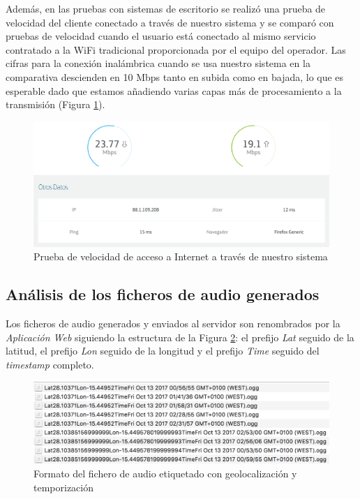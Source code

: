 Además, en las pruebas con sistemas de escritorio se realizó una prueba de velocidad del cliente conectado a través de nuestro sistema y se comparó con pruebas de velocidad cuando el usuario está conectado al mismo servicio contratado a la WiFi tradicional proporcionada por el equipo del operador. Las cifras para la conexión inalámbrica cuando se usa nuestro sistema en la comparativa descienden en 10 Mbps tanto en subida como en bajada, lo que es esperable dado que estamos añadiendo varias capas más de procesamiento a la transmisión (Figura \ref{speed}).

\begin{figure}[!t]
\begin{center}
\includegraphics[width=0.75\linewidth]{./6_EvalEmpirica/Img/speed.png}
\end{center}
\caption{Prueba de velocidad de acceso a Internet a través de nuestro sistema}
\label{speed}
\end{figure}

\subsection{Análisis de los ficheros de audio generados}
Los ficheros de audio generados y enviados al servidor son renombrados por la \emph{Aplicación Web} siguiendo la estructura de la Figura \ref{audioFiles}: el prefijo \emph{Lat} seguido de la latitud, el prefijo \emph{Lon} seguido de la longitud y el prefijo \emph{Time} seguido del \emph{timestamp} completo.

\begin{figure}[!t]
\begin{center}
\includegraphics[width=0.75\linewidth]{./6_EvalEmpirica/Img/audioFiles.png}
\end{center}
\caption{Formato del fichero de audio etiquetado con geolocalización y temporización}
\label{audioFiles}
\end{figure}

